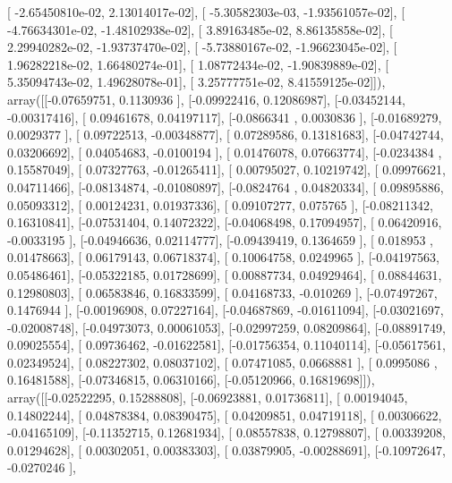 \documentclass{article}
\begin{document}
       [ -2.65450810e-02,   2.13014017e-02],
       [ -5.30582303e-03,  -1.93561057e-02],
       [ -4.76634301e-02,  -1.48102938e-02],
       [  3.89163485e-02,   8.86135858e-02],
       [  2.29940282e-02,  -1.93737470e-02],
       [ -5.73880167e-02,  -1.96623045e-02],
       [  1.96282218e-02,   1.66480274e-01],
       [  1.08772434e-02,  -1.90839889e-02],
       [  5.35094743e-02,   1.49628078e-01],
       [  3.25777751e-02,   8.41559125e-02]]), array([[-0.07659751,  0.1130936 ],
       [-0.09922416,  0.12086987],
       [-0.03452144, -0.00317416],
       [ 0.09461678,  0.04197117],
       [-0.0866341 ,  0.0030836 ],
       [-0.01689279,  0.0029377 ],
       [ 0.09722513, -0.00348877],
       [ 0.07289586,  0.13181683],
       [-0.04742744,  0.03206692],
       [ 0.04054683, -0.0100194 ],
       [ 0.01476078,  0.07663774],
       [-0.0234384 ,  0.15587049],
       [ 0.07327763, -0.01265411],
       [ 0.00795027,  0.10219742],
       [ 0.09976621,  0.04711466],
       [-0.08134874, -0.01080897],
       [-0.0824764 ,  0.04820334],
       [ 0.09895886,  0.05093312],
       [ 0.00124231,  0.01937336],
       [ 0.09107277,  0.075765  ],
       [-0.08211342,  0.16310841],
       [-0.07531404,  0.14072322],
       [-0.04068498,  0.17094957],
       [ 0.06420916, -0.0033195 ],
       [-0.04946636,  0.02114777],
       [-0.09439419,  0.1364659 ],
       [ 0.018953  ,  0.01478663],
       [ 0.06179143,  0.06718374],
       [ 0.10064758,  0.0249965 ],
       [-0.04197563,  0.05486461],
       [-0.05322185,  0.01728699],
       [ 0.00887734,  0.04929464],
       [ 0.08844631,  0.12980803],
       [ 0.06583846,  0.16833599],
       [ 0.04168733, -0.010269  ],
       [-0.07497267,  0.1476944 ],
       [-0.00196908,  0.07227164],
       [-0.04687869, -0.01611094],
       [-0.03021697, -0.02008748],
       [-0.04973073,  0.00061053],
       [-0.02997259,  0.08209864],
       [-0.08891749,  0.09025554],
       [ 0.09736462, -0.01622581],
       [-0.01756354,  0.11040114],
       [-0.05617561,  0.02349524],
       [ 0.08227302,  0.08037102],
       [ 0.07471085,  0.0668881 ],
       [ 0.0995086 ,  0.16481588],
       [-0.07346815,  0.06310166],
       [-0.05120966,  0.16819698]]), array([[-0.02522295,  0.15288808],
       [-0.06923881,  0.01736811],
       [ 0.00194045,  0.14802244],
       [ 0.04878384,  0.08390475],
       [ 0.04209851,  0.04719118],
       [ 0.00306622, -0.04165109],
       [-0.11352715,  0.12681934],
       [ 0.08557838,  0.12798807],
       [ 0.00339208,  0.01294628],
       [ 0.00302051,  0.00383303],
       [ 0.03879905, -0.00288691],
       [-0.10972647, -0.0270246 ],
\end{document}
